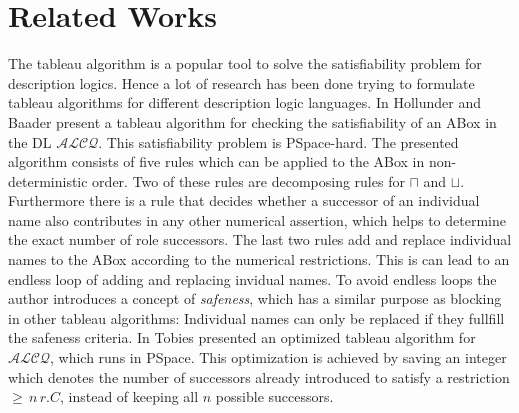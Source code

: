 \documentclass{book}
\theoremstyle{break}
\theoremstyle{definition}
\begin{document}
\section{Related Works}
The tableau algorithm is a popular tool to solve the satisfiability problem for description logics. Hence a lot of research has been done trying to formulate tableau algorithms for different description logic languages. In \cite{1} Hollunder and Baader present a tableau algorithm for checking the satisfiability of an ABox in the DL $\mathcal{ALCQ}$. This satisfiability problem is PSpace-hard. The presented algorithm consists of five rules which can be applied to the ABox in non-deterministic order. Two of these rules are decomposing rules for $\sqcap$ and $\sqcup$. Furthermore there is a rule that decides whether a successor of an individual name also contributes in any other numerical assertion, which helps to determine the exact number of role successors. The last two rules add and replace individual names to the ABox according to the numerical restrictions. This is can lead to an endless loop of adding and replacing invidual names. To avoid endless loops the author introduces a concept of \textit{safeness}, which has a similar purpose as blocking in other tableau algorithms: Individual names can only be replaced if they fullfill the safeness criteria. In \cite{pspace} Tobies presented an optimized tableau algorithm for $\mathcal{ALCQ}$, which runs in PSpace. This optimization is achieved by saving an integer which denotes the number of successors already introduced to satisfy a restriction $\geq\,n\,r.C$, instead of keeping all $n$ possible successors.\\
\end{document}
